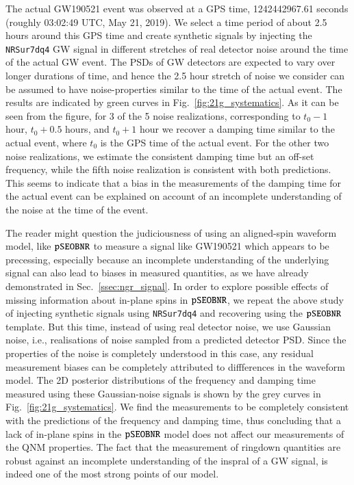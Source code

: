 The actual GW190521 event was observed at a GPS time, 1242442967.61 seconds (roughly 03:02:49 UTC, May 21, 2019). We select a time period of about 2.5 hours around this GPS time and create synthetic signals by injecting the \texttt{NRSur7dq4} GW signal in different stretches of real detector noise around the time of the actual GW event. The PSDs of GW detectors are expected to vary over
longer durations of time, and hence the 2.5 hour stretch of noise we consider can be assumed to have noise-properties similar to the time of the actual event. The results are indicated by green curves in Fig.~\ref{fig:21g_systematics}. As it can be seen from the figure, for 3 of the 5 noise realizations, corresponding to $t_0-1$ hour, $t_0+0.5$ hours, and $t_0+1$ hour we recover a damping time similar to the actual event, where $t_0$ is the GPS time of the actual event. For the other two noise realizations, we estimate the consistent damping time but an off-set frequency, while the fifth noise realization is consistent with both predictions. This seems to indicate that a bias in the measurements of the damping time for the actual event can be explained on account of an incomplete understanding of the noise at the time of the event.

The reader might question the judiciousness of using an aligned-spin waveform model, like $\texttt{pSEOBNR}$ to measure a signal like GW190521 which appears to be precessing, especially because an incomplete understanding of the underlying signal can also lead to biases in measured quantities, as we have already demonstrated in Sec.~\ref{ssec:ngr_signal}. In order to explore possible effects of missing information about in-plane spins in $\texttt{pSEOBNR}$, we repeat the above study of injecting synthetic signals using \texttt{NRSur7dq4} and recovering using the $\texttt{pSEOBNR}$ template. But this time, instead of using real detector noise, we use Gaussian noise, i.e., realisations of noise sampled from a predicted detector PSD. Since the properties of the noise is completely understood in this case, any residual measurement biases can be completely attributed to diffferences in the waveform model. The 2D posterior distributions of the frequency and damping time measured using these Gaussian-noise signals is shown by the grey curves in Fig.~\ref{fig:21g_systematics}. We find the measurements to be completely consistent with the predictions of the frequency and damping time, thus concluding that a lack of in-plane spins in the $\texttt{pSEOBNR}$ model does not affect our measurements of the QNM properties. The fact that the measurement of ringdown quantities are robust against an incomplete understanding of the inspral of a GW signal, is indeed one of the most strong points of our model.

